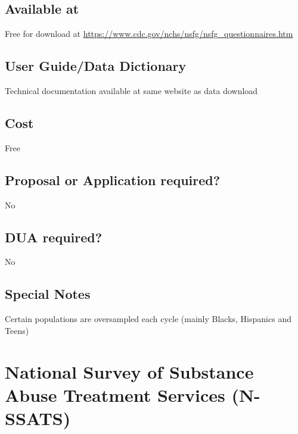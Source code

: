 \documentclass[
]{book}
\begin{document}
\hypertarget{available-at-63}{%
\section{Available at}\label{available-at-63}}

Free for download at \url{https://www.cdc.gov/nchs/nsfg/nsfg_questionnaires.htm}

\hypertarget{user-guidedata-dictionary-63}{%
\section{User Guide/Data Dictionary}\label{user-guidedata-dictionary-63}}

Technical documentation available at same website as data download

\hypertarget{cost-63}{%
\section{Cost}\label{cost-63}}

Free

\hypertarget{proposal-or-application-required-63}{%
\section{Proposal or Application required?}\label{proposal-or-application-required-63}}

No

\hypertarget{dua-required-63}{%
\section{DUA required?}\label{dua-required-63}}

No

\hypertarget{special-notes-63}{%
\section{Special Notes}\label{special-notes-63}}

Certain populations are oversampled each cycle (mainly Blacks, Hispanics and Teens)

\mainmatter

\hypertarget{national-survey-of-substance-abuse-treatment-services-n-ssats}{%
\chapter{National Survey of Substance Abuse Treatment Services (N-SSATS)}\label{national-survey-of-substance-abuse-treatment-services-n-ssats}}
\end{document}
